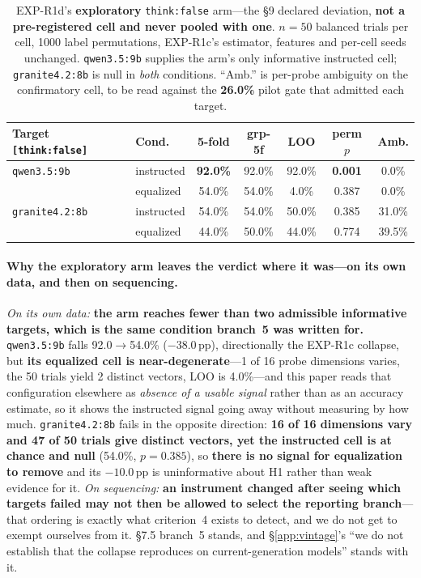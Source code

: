 \begin{table}[h]
\centering
\small
\begin{tabular}{@{}llccccc@{}}
\toprule
\textbf{Target} \texttt{[think:false]} & \textbf{Cond.} & \textbf{5-fold} & \textbf{grp-5f} & \textbf{LOO} & \textbf{perm $p$} & \textbf{Amb.} \\
\midrule
\texttt{qwen3.5:9b}    & instructed & \textbf{92.0\%} & 92.0\% & 92.0\% & \textbf{0.001} & \phantom{0}0.0\% \\
                       & equalized  & 54.0\% & 54.0\% & \phantom{0}4.0\% & 0.387 & \phantom{0}0.0\% \\
\texttt{granite4.2:8b} & instructed & 54.0\% & 54.0\% & 50.0\% & 0.385 & 31.0\% \\
                       & equalized  & 44.0\% & 50.0\% & 44.0\% & 0.774 & 39.5\% \\
\bottomrule
\end{tabular}
\caption{EXP-R1d's \textbf{exploratory} \texttt{think:false} arm---the §9 declared deviation, \textbf{not a pre-registered cell and never pooled with one}. $n=50$ balanced trials per cell, 1000 label permutations, EXP-R1c's estimator, features and per-cell seeds unchanged. \texttt{qwen3.5:9b} supplies the arm's only informative instructed cell; \texttt{granite4.2:8b} is null in \emph{both} conditions. ``Amb.'' is per-probe ambiguity on the confirmatory cell, to be read against the \textbf{26.0\%} pilot gate that admitted each target.}
\label{tab:r1d_thinkoff}
\end{table}

\paragraph{Why the exploratory arm leaves the verdict where it was---on its own data, and then on sequencing.} \emph{On its own data:} \textbf{the arm reaches fewer than two admissible informative targets, which is the same condition branch~5 was written for.} \texttt{qwen3.5:9b} falls 92.0$\to$54.0\% ($-38.0$\,pp), directionally the EXP-R1c collapse, but \textbf{its equalized cell is near-degenerate}---1 of 16 probe dimensions varies, the 50 trials yield 2 distinct vectors, LOO is 4.0\%---and this paper reads that configuration elsewhere as \emph{absence of a usable signal} rather than as an accuracy estimate, so it shows the instructed signal going away without measuring by how much. \texttt{granite4.2:8b} fails in the opposite direction: \textbf{16 of 16 dimensions vary and 47 of 50 trials give distinct vectors, yet the instructed cell is at chance and null} (54.0\%, $p=0.385$), so \textbf{there is no signal for equalization to remove} and its $-10.0$\,pp is uninformative about H1 rather than weak evidence for it. \emph{On sequencing:} \textbf{an instrument changed after seeing which targets failed may not then be allowed to select the reporting branch}---that ordering is exactly what criterion~4 exists to detect, and we do not get to exempt ourselves from it. §7.5 branch~5 stands, and §\ref{app:vintage}'s ``we do not establish that the collapse reproduces on current-generation models'' stands with it.

